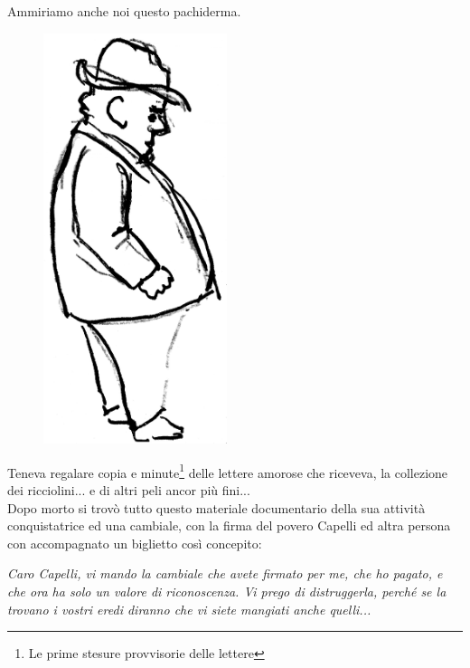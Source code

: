 \noindent Ammiriamo anche noi questo pachiderma.
 \begin{figure}[htb]
    \centering
    \includegraphics[height=12cm]{Capelli_mangione}
\end{figure}

\newpage
Teneva regalare copia e minute\footnote{Le prime stesure provvisorie delle lettere} delle lettere amorose che riceveva, la collezione dei ricciolini... e di altri peli ancor più fini...\\
Dopo morto si trovò tutto questo materiale documentario della sua attività conquistatrice ed una cambiale, con la firma del povero Capelli ed altra persona con accompagnato un biglietto così concepito:
\begin{center}
	\emph{Caro Capelli, vi mando la cambiale che avete firmato per me, che ho pagato, e che ora ha solo un valore di riconoscenza. Vi prego di distruggerla, perché se la trovano i vostri eredi diranno che vi siete mangiati anche quelli...}
\end{center}
\:
\:
